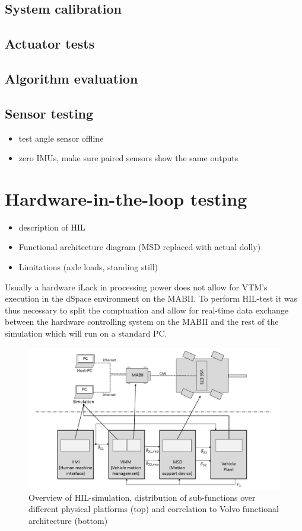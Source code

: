 \documentclass[ExampleMasters.tex]{subfiles}
\begin{document}
\subsection{System calibration}
\subsection{Actuator tests}
\subsection{Algorithm evaluation}
\subsection{Sensor testing}

\begin{itemize}
	\item test angle sensor offline
	\item zero IMUs, make sure paired sensors show the same outputs
	
\end{itemize}

\section{Hardware-in-the-loop testing}
\label{sec:HIL}
\begin{itemize}
	\item description of HIL
	\item Functional architecture diagram (MSD replaced with actual dolly)
	\item Limitations (axle loads, standing still)
\end{itemize}

Usually a hardware iLack in processing power does not allow for VTM's execution in the dSpace environment on the MABII. To perform HIL-test it was thus necessary to split the comptuation and allow for real-time data exchange between the hardware controlling system on the MABII and the rest of the simulation which will run on a standard PC. 

\begin{figure}[h]
\centering
\includegraphics[width=1\linewidth]{figures/HIL_overview}
\caption{Overview of HIL-simulation, distribution of sub-functions over different physical platforms (top) and correlation to Volvo functional architecture (bottom)}

\label{fig:HIL_overview}
\end{figure}
\end{document}
